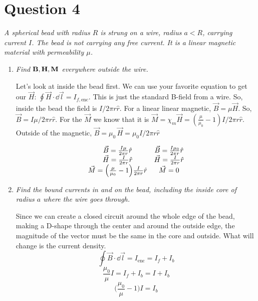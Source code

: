 \documentclass[12pt]{article}
\begin{document}
\begin{enumerate}[label=\alph*)]
\end{enumerate}

\newpage

\section*{Question 4}
{\sl A spherical bead with radius $R$ is strung on a wire, radius $a<R$, carrying current $I$. The bead is not carrying any free current. It is a linear magnetic material with permeability $\mu$.}
\begin{enumerate}[label=\alph*)]
\item {\sl Find $\vb{B}, \vb{H}, \vb{M}$ everywhere outside the wire.}

Let's look at inside the bead first. We can use your favorite equation to get our $\vec{H}$: $\oint \vec{H} \cdot \dd{\vec{l}} = I_{f, \text{enc}}$. This is just the standard B-field from a wire. So, inside the bead the field is $I/2\pi r \hat{r}$. For a linear linear magnetic, $\vec{B} = \mu \vec{H}$. So, $\vec{B} = I\mu /2\pi r \hat{r}$. For the $\vec{M}$ we know that it is $\vec{M} = \chi_m \vec{H} = (\frac{\mu}{\mu_0} - 1)I/2\pi r \hat{r}$. Outside of the magnetic, $\vec{B} = \mu_0 \, \vec{H} = \mu_0 I/2\pi r \hat{r}$

\[\mqty{\vec{B} = \frac{I\mu}{2 \pi r}\hat{r} & \vec{B} = \frac{I\mu_0}{2 \pi r}\hat{r} \\ \vec{H} = \frac{I}{2 \pi r}\hat{r} & \vec{H} = \frac{I}{2 \pi r}\hat{r} \\ \vec{M} = \Big(\frac{\mu}{\mu_0}-1\Big)\frac{I}{2 \pi r} \hat{r} & \vec{M} = 0}\]


\item {\sl Find the bound currents in and on the bead, including the inside core of radius $a$ where the wire goes through.}

Since we can create a closed circuit around the whole edge of the bead, making a D-shape through the center and around the outside edge, the magnitude of the vector must be the same in the core and outside. What will change is the current density. 
\[\oint \vec{B} \cdot \dd{\vec{l}} = I_{\text{enc}} = I_f + I_b\]
\[\frac{\mu_0}{\mu} I = I_f + I_b = I+I_b\]
\[\boxed{\Big(\frac{\mu_0}{\mu} -1\Big)I = I_b}\]

\end{enumerate}

\newpage
\end{document}
